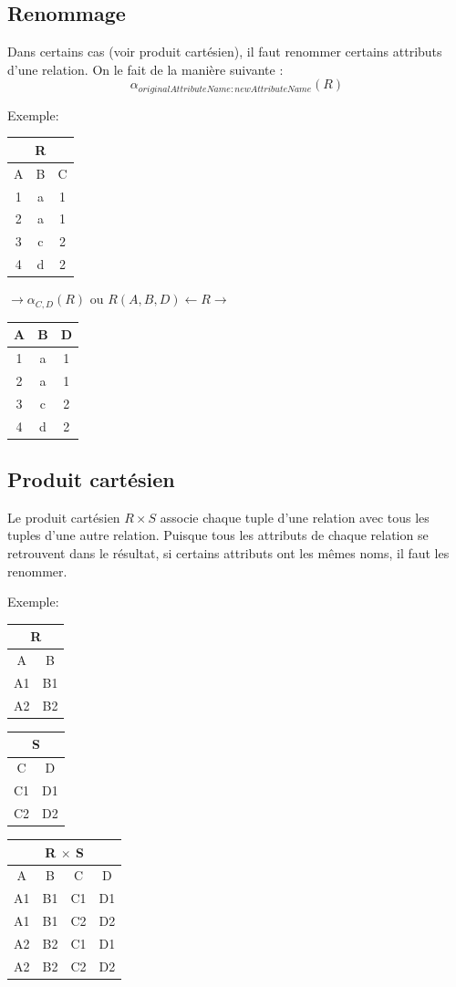 \documentclass[a4paper]{article}
\begin{document}
  

  \subsection{Renommage}
  Dans certains cas (voir produit cartésien), il faut renommer certains attributs
  d'une relation. On le fait de la manière suivante :
  $$ \alpha_{originalAttributeName:newAttributeName}(R) $$
  
  Exemple:
  \begin{tabular}{|c|c|c|}
	\multicolumn{3}{c}{R}\\
	\hline
	A & B & C\\
	\hline\hline
	1 & a & 1\\
	2 & a & 1\\
	3 & c & 2\\
	4 & d & 2\\
	\hline
  \end{tabular}
  $\rightarrow \alpha_{C,D}(R)$ ou $R(A,B,D)\leftarrow R \rightarrow$
  \begin{tabular}{|c|c|c|}
	\hline
	A& B & \textcolor[rgb]{1,0,0}{D}\\
	\hline\hline
	1 & a & 1\\
	2 & a & 1\\
	3 & c & 2\\
	4 & d & 2\\
	\hline
  \end{tabular}

  \subsection{Produit cartésien}
  Le produit cartésien $R \times S$ associe chaque tuple d'une relation avec tous les tuples
  d'une autre relation. Puisque tous les attributs de chaque relation se retrouvent
  dans le résultat, si certains attributs ont les mêmes noms, il faut les renommer.
  
  Exemple:
  \begin{tabular}{|c|c|}
	\multicolumn{2}{c}{R}\\
	\hline
	A & B\\
	\hline\hline
	A1 & B1\\
	A2 & B2\\
	\hline
  \end{tabular}
  \begin{tabular}{|c|c|}
	\multicolumn{2}{c}{S}\\
	\hline
	C & D\\
	\hline\hline
	C1 & D1\\
	C2 & D2\\
	\hline
  \end{tabular}
  \begin{tabular}{|c|c|c|c|}
	\multicolumn{4}{c}{\textcolor[rgb]{1,0,0}{R $\times$ S}}\\
	\hline
	A & B & C & D\\
	\hline\hline
	A1 & B1 & C1 & D1\\
	A1 & B1 & C2 & D2\\
	A2 & B2 & C1 & D1\\
	A2 & B2 & C2 & D2\\
	\hline
  \end{tabular}
\end{document}
